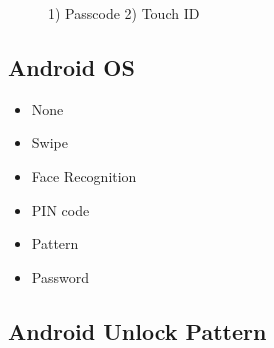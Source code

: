 \begin{figure}[H]
{      }
      \caption{1) Passcode 2) Touch ID }
    \end{figure}

  \clearpage
    \subsection{Android OS}

      \begin{itemize}
        \item None
        \item Swipe
        \item Face Recognition
        \item PIN code
        \item Pattern
        \item Password
      \end{itemize}

    
      \subsection*{Android Unlock Pattern}

